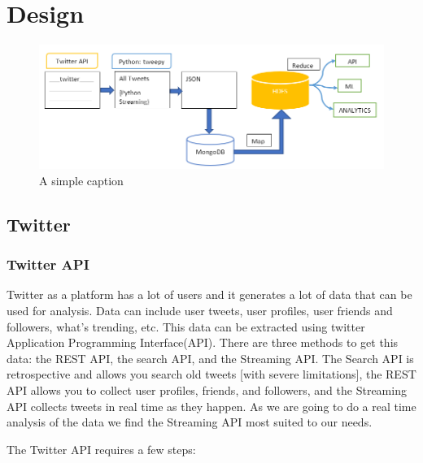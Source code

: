 \chapter{Design}

\begin{figure}[ht!]
	\centering
	\includegraphics[width=150mm]{DesignDiagram.png}
	\caption{A simple caption \label{overflow}}
\end{figure}

\section{Twitter}

\subsection{Twitter API}\label{ch1:opts}

Twitter as a platform has a lot of users and it generates a lot of data that can be used for analysis. Data can include user tweets, user profiles, user friends and followers, what’s trending, etc. This data can be extracted using twitter Application Programming Interface(API). There are three methods to get this data: the REST API, the search API, and the Streaming API. The Search API is retrospective and allows you search old tweets [with severe limitations], the REST API allows you to collect user profiles, friends, and followers, and the Streaming API collects tweets in real time as they happen. As we are going to do a real time analysis of the data we find the Streaming API most suited to our needs.

The Twitter API requires a few steps:

